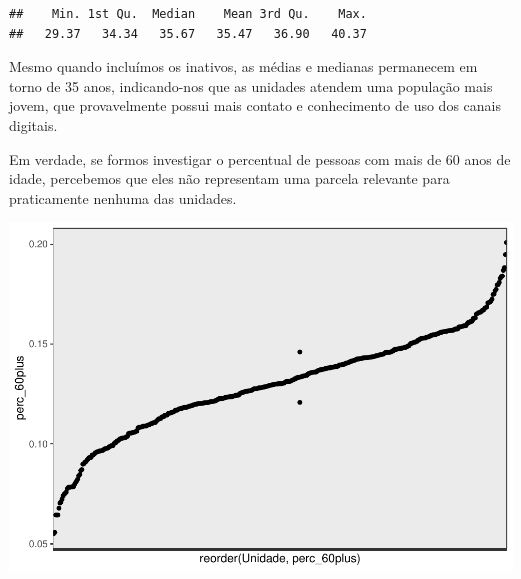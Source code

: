 \documentclass[]{article}
\newenvironment{Shaded}{\begin{snugshade}}{\end{snugshade}}
\newcommand{\DataTypeTok}[1]{\textcolor[rgb]{0.13,0.29,0.53}{#1}}
\newcommand{\DecValTok}[1]{\textcolor[rgb]{0.00,0.00,0.81}{#1}}
\newcommand{\KeywordTok}[1]{\textcolor[rgb]{0.13,0.29,0.53}{\textbf{#1}}}
\newcommand{\NormalTok}[1]{#1}
\newcommand{\OperatorTok}[1]{\textcolor[rgb]{0.81,0.36,0.00}{\textbf{#1}}}
\newcommand{\StringTok}[1]{\textcolor[rgb]{0.31,0.60,0.02}{#1}}
\begin{document}
\begin{verbatim}
##    Min. 1st Qu.  Median    Mean 3rd Qu.    Max. 
##   29.37   34.34   35.67   35.47   36.90   40.37
\end{verbatim}

Mesmo quando incluímos os inativos, as médias e medianas permanecem em
torno de 35 anos, indicando-nos que as unidades atendem uma população
mais jovem, que provavelmente possui mais contato e conhecimento de uso
dos canais digitais.

Em verdade, se formos investigar o percentual de pessoas com mais de 60
anos de idade, percebemos que eles não representam uma parcela relevante
para praticamente nenhuma das unidades.

\begin{Shaded}
\end{Shaded}

\includegraphics{trabalho_de_conclusao_final_files/figure-latex/unnamed-chunk-15-1.pdf}
\end{document}
